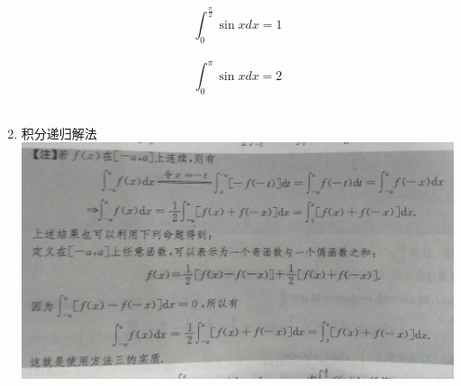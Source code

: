 \documentclass[11pt]{article}
\makeatletter
\def\maxwidth{\ifdim\Gin@nat@width>\linewidth\linewidth
    \else\Gin@nat@width\fi}
\let\Oldincludegraphics\includegraphics
\renewcommand{\includegraphics}[1]{\Oldincludegraphics[width=.8\maxwidth]{#1}}
\makeatother
\begin{document}
\begin{enumerate}
  \[ \int_0^\frac{\pi}{2} \sin x dx = 1\]\\
  \[ \int_0^\pi \sin x dx =2\]\\
\item
  积分递归解法\\
  \includegraphics{9345E7/2002379869.jpg}
\end{enumerate}
\end{document}
